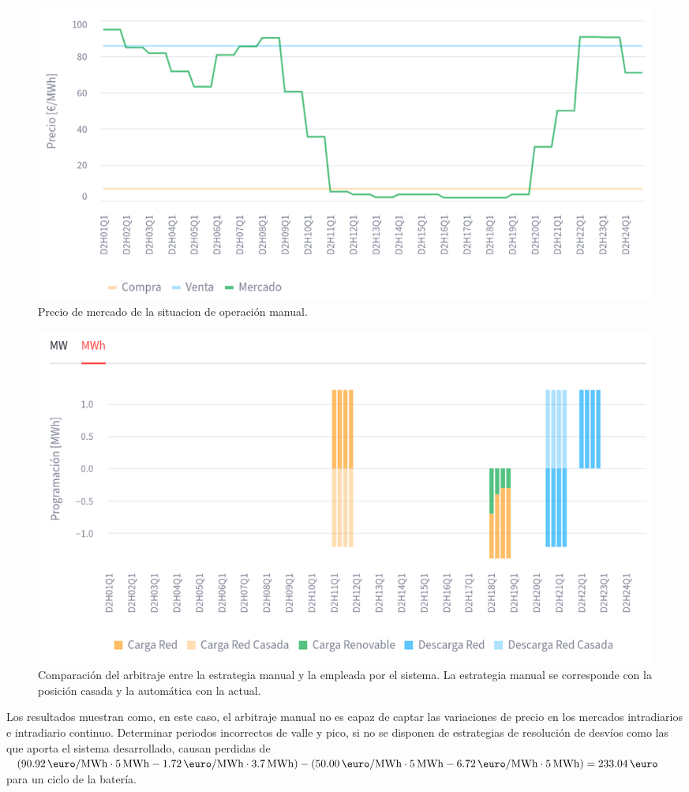 \begin{figure}
  \centering
  \includegraphics[width=0.75\linewidth]{figures/manual-auto-precio.png}
  \caption[Precio de mercado de la situacion de operación manual.]{Precio de mercado de la situacion de operación manual.}
  \label{fig:manual-auto-precio}
\end{figure}

\begin{figure}
  \centering
  \includegraphics[width=0.75\linewidth]{figures/manual-auto-posicion.png}
  \caption[Comparación del arbitraje entre la estrategia manual y la automática.]{Comparación del arbitraje entre la estrategia manual y la empleada por el sistema. La estrategia manual se corresponde con la posición casada y la automática con la actual.}
  \label{fig:manual-auto-posicion}
\end{figure}

Los resultados muestran como, en este caso, el arbitraje manual no es capaz de captar las variaciones de precio en los mercados intradiarios e intradiario continuo. Determinar periodos incorrectos de valle y pico, si no se disponen de estrategias de resolución de desvíos como las que aporta el sistema desarrollado, causan perdidas de \( (\SI{90.92}{\text{\euro}\per\mega\watt\hour} \cdot \SI{5}{{\mega\watt\hour}} - \SI{1.72}{\text{\euro}\per\mega\watt\hour} \cdot \SI{3.7}{{\mega\watt\hour}} ) - (\SI{50.00}{\text{\euro}\per\mega\watt\hour} \cdot \SI{5}{{\mega\watt\hour}} - \SI{6.72}{\text{\euro}\per\mega\watt\hour} \cdot \SI{5}{{\mega\watt\hour}}) = \SI{233.04}{\text{\euro}} \) para un ciclo de la batería.

